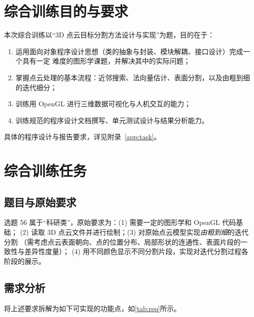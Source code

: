 
\section{综合训练目的与要求}

本次综合训练以“3D 点云目标分割方法设计与实现”为题，目的在于：

\begin{enumerate}[label=(\arabic*)]
  \item 运用面向对象程序设计思想（类的抽象与封装、模块解耦、接口设计）完成一个具有一定
        难度的图形学课题，并解决其中的实际问题；
  \item 掌握点云处理的基本流程：近邻搜索、法向量估计、表面分割，以及由粗到细的迭代细分；
  \item 训练用 OpenGL 进行三维数据可视化与人机交互的能力；
  \item 训练规范的程序设计文档撰写、单元测试设计与结果分析能力。
\end{enumerate}

具体的程序设计与报告要求，详见附录~\ref{app:task}。

\section{综合训练任务}

\subsection{题目与原始要求}
选题 56 属于“科研类”，原始要求为：(1) 需要一定的图形学和 OpenGL 代码基础；
(2) 读取 3D 点云文件并进行绘制；(3) 对原始点云模型实现\emph{由粗到细}的迭代分割
（需考虑点云表面朝向、点的位置分布、局部形状的连通性、表面片段的一致性与差异性度量）；
(4) 用不同颜色显示不同分割片段，实现对迭代分割过程各阶段的展示。

\subsection{需求分析}
将上述要求拆解为如下可实现的功能点，如\autoref{tab:req}所示。

